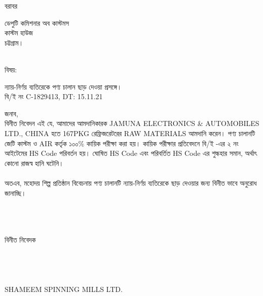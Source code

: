 \documentclass[12pt]{article}
\newcommand{\beno}{C-1829413}
\newcommand{\bedt}{15.11.21}
\newcommand{\co}{CHINA}
\newcommand{\pkg}{167PKG}
\newcommand{\good}{RAW MATERIALS}
\newcommand{\impn}{JAMUNA ELECTRONICS \& AUTOMOBILES LTD.}
\newcommand{\cnfn}{SHAMEEM SPINNING MILLS LTD.}
\begin{document}
\noindent
বরাবর
\\
\begin{minipage}[t]{0.06\linewidth}
\hspace{1em}
\end{minipage}
\begin{minipage}[t]{0.94\linewidth}
ডেপুটি কমিশনার অব কাস্টমস
\\
কাস্টম হাউজ
\\
চট্টগ্রাম।
\\
\\
\end{minipage}
\begin{minipage}[t]{0.06\linewidth}
বিষয়:
\end{minipage}
\begin{minipage}[t]{0.94\linewidth}
ন্যায়-নির্ণয় ব্যতিরেকে পণ্য চালান ছাড় দেওয়া প্রসঙ্গে।
\\
বি/ই নং {\beno}, DT: {\bedt}
\\
\end{minipage}
জনাব,
\\
\hspace*{2.7em}বিনীত নিবেদন এই যে, আমাদের আমদানিকারক {\impn},
{\co} হতে {\pkg} রেফ্রিজরেটরের {\good} আমদানি করেন। পণ্য চালানটি জেটি কাস্টম ও AIR কর্তৃক ১০০\% কায়িক পরীক্ষা করা হয়। কায়িক পরীক্ষার প্রতিবেদনে বি/ই -এর ২ নং আইটেমের HS Code পরিবর্তন হয়। ঘোষিত HS Code এবং পরিবর্তিত  HS Code এর শুল্কহার সমান, অর্থাৎ কোনো রাজস্ব হানি ঘটেনি।
\\
\\
অতএব, মহোদয় শিল্প প্রতিষ্ঠান বিবেচনায় পণ্য চালানটি ন্যায়-নির্ণয়
ব্যতিরেকে ছাড় দেওয়ার জন্য বিনীত ভাবে অনুরোধ জানাচ্ছি।
\\
\\
\\
\\
\begin{minipage}[t]{0.50\linewidth}
\hspace{1em}
\end{minipage}
\begin{minipage}[t]{0.60\linewidth}
বিনীত নিবেদক
\\
\\
\\
\\
\\
{\cnfn}
\end{minipage}
\thispagestyle{laststyle}
\end{document}
